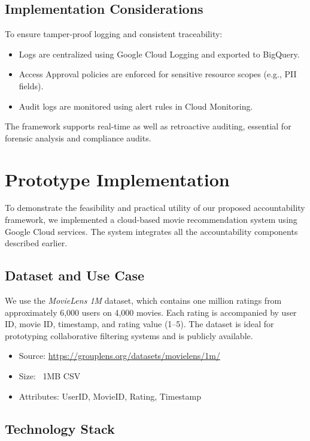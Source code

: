 \documentclass[acmsmall]{acmart}
\begin{document}
\subsection{Implementation Considerations}

To ensure tamper-proof logging and consistent traceability:
\begin{itemize}
    \item Logs are centralized using Google Cloud Logging and exported to BigQuery.
    \item Access Approval policies are enforced for sensitive resource scopes (e.g., PII fields).
    \item Audit logs are monitored using alert rules in Cloud Monitoring.
\end{itemize}

The framework supports real-time as well as retroactive auditing, essential for forensic analysis and compliance audits.


\section{Prototype Implementation}

To demonstrate the feasibility and practical utility of our proposed accountability framework, we implemented a cloud-based movie recommendation system using Google Cloud services. The system integrates all the accountability components described earlier.

\subsection{Dataset and Use Case}

We use the \textit{MovieLens 1M} \cite{movielens}dataset, which contains one million ratings from approximately 6,000 users on 4,000 movies. Each rating is accompanied by user ID, movie ID, timestamp, and rating value (1–5). The dataset is ideal for prototyping collaborative filtering systems and is publicly available.

\begin{itemize}
    \item Source: \url{https://grouplens.org/datasets/movielens/1m/}
    \item Size: ~1MB CSV
    \item Attributes: UserID, MovieID, Rating, Timestamp
\end{itemize}

\subsection{Technology Stack}
\end{document}
